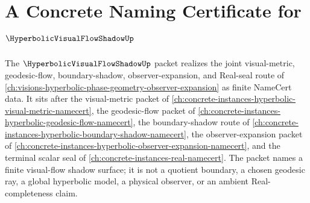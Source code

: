 \chapter{A Concrete Naming Certificate for $\HyperbolicVisualFlowShadowUp$}
\label{ch:concrete-instances-hyperbolic-visual-flow-shadow-namecert}

The $\HyperbolicVisualFlowShadowUp$ packet realizes the joint visual-metric, geodesic-flow, boundary-shadow, observer-expansion, and Real-seal route of \autoref{ch:visions-hyperbolic-phase-geometry-observer-expansion} as finite NameCert data. It sits after the visual-metric packet of \autoref{ch:concrete-instances-hyperbolic-visual-metric-namecert}, the geodesic-flow packet of \autoref{ch:concrete-instances-hyperbolic-geodesic-flow-namecert}, the boundary-shadow route of \autoref{ch:concrete-instances-hyperbolic-boundary-shadow-namecert}, the observer-expansion packet of \autoref{ch:concrete-instances-hyperbolic-observer-expansion-namecert}, and the terminal scalar seal of \autoref{ch:concrete-instances-real-namecert}. The packet names a finite visual-flow shadow surface; it is not a quotient boundary, a chosen geodesic ray, a global hyperbolic model, a physical observer, or an ambient Real-completeness claim.

